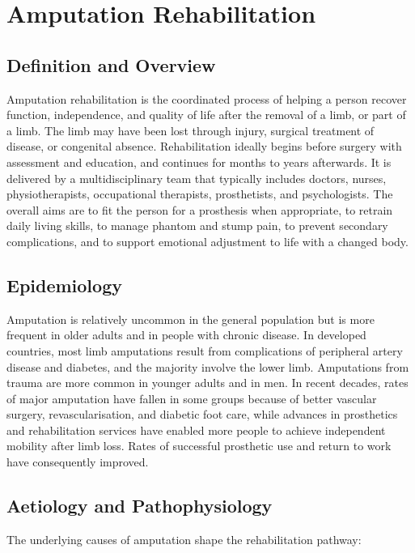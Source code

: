 \chapter{Amputation Rehabilitation}

\section*{Definition and Overview}
Amputation rehabilitation is the coordinated process of helping a person recover function, independence, and quality of life after the removal of a limb, or part of a limb. The limb may have been lost through injury, surgical treatment of disease, or congenital absence. Rehabilitation ideally begins before surgery with assessment and education, and continues for months to years afterwards. It is delivered by a multidisciplinary team that typically includes doctors, nurses, physiotherapists, occupational therapists, prosthetists, and psychologists. The overall aims are to fit the person for a prosthesis when appropriate, to retrain daily living skills, to manage phantom and stump pain, to prevent secondary complications, and to support emotional adjustment to life with a changed body.

\section*{Epidemiology}
Amputation is relatively uncommon in the general population but is more frequent in older adults and in people with chronic disease. In developed countries, most limb amputations result from complications of peripheral artery disease and diabetes, and the majority involve the lower limb. Amputations from trauma are more common in younger adults and in men. In recent decades, rates of major amputation have fallen in some groups because of better vascular surgery, revascularisation, and diabetic foot care, while advances in prosthetics and rehabilitation services have enabled more people to achieve independent mobility after limb loss. Rates of successful prosthetic use and return to work have consequently improved.

\section*{Aetiology and Pathophysiology}
The underlying causes of amputation shape the rehabilitation pathway:

